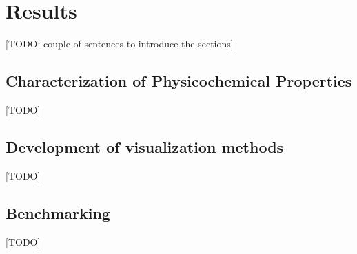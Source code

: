 \chapter{Results} %

[TODO: couple of sentences to introduce the sections]

\section{Characterization of Physicochemical Properties}
  [TODO]


\section{Development of visualization methods}
  [TODO]


\section{Benchmarking}
  [TODO]


